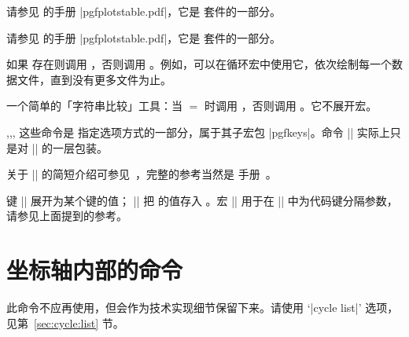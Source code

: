 \begin{command}{\pgfplotstableread{}}
    请参见 \PGFPlotstable{} 的手册 |pgfplotstable.pdf|，它是 \PGFPlots{} 套件的一部分。
\end{command}

\begin{command}{\pgfplotstabletypeset{}}
    请参见 \PGFPlotstable{} 的手册 |pgfplotstable.pdf|，它是 \PGFPlots{} 套件的一部分。
\end{command}

\begin{command}{\pgfplotsiffileexists{}}
    如果  存在则调用 ，否则调用 。例如，可以在循环宏中使用它，依次绘制每一个数据文件，直到没有更多文件为止。
\end{command}

\begin{command}{\pgfplotsutilifstringequal{}}
    一个简单的「字符串比较」工具：当 
    $=$ 时调用 ，否则调用 。它不展开宏。
\end{command}

\begin{commandlist}{\pgfkeys,\pgfeov,\pgfkeysvalueof,\pgfkeysgetvalue}
    这些命令是 \Tikz{} 指定选项方式的一部分，属于其子宏包 |pgfkeys|。命令 |\pgfplotsset| 实际上只是对 |\pgfkeys| 的一层包装。

    关于 |\pgfkeys| 的简短介绍可参见~\cite{keyvalintro}，完整的参考当然是 \Tikz{} 手册~\cite{tikz}。

    键 |\pgfkeysvalueof| 展开为某个键的值；
    |\pgfkeysgetvalue| 把  的值存入 。宏 |\pgfeov| 用于在 |\pgfkeys| 中为代码键分隔参数，请参见上面提到的参考。
\end{commandlist}


\section[PGFPlots 坐标轴内部的命令]
        {{\normalfont\PGFPlots{}} 坐标轴内部的命令}

\begin{command}{\autoplotspeclist}
    此命令不应再使用，但会作为技术实现细节保留下来。请使用 `|cycle list|' 选项，见第~\ref{sec:cycle:list} 节。
\end{command}

